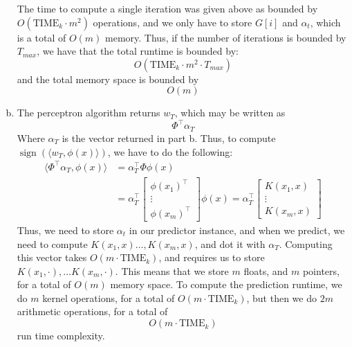 \documentclass{amsart}
\newcommand{\TIMEk}{\mathrm{TIME}_k}
\DeclareMathOperator{\sign}{sign}
\theoremstyle{definition}
\begin{document}
\begin{enumerate}[(a)]
    The time to compute a single iteration was given above as bounded by $O(\TIMEk \cdot m^2)$ operations, and we only have to store $G[i]$ and $\alpha_t$, which is a total of $O(m)$ memory. Thus, if the number of iterations is bounded by $T_{max}$, we have that the total runtime is bounded by:
    \[
      O(\TIMEk \cdot m^2 \cdot T_{max})
    \]
    and the total memory space is bounded by 
    \[
      O(m)
    \]
  \item 
    The perceptron algorithm returns $w_T$, which may be written as 
    \[
      \Phi^\intercal \alpha_T
    \]
    Where $\alpha_T$ is the vector returned in part b. Thus, to compute $\sign(\langle w_T, \phi(x) \rangle)$, we have to do the following:
    \begin{align*}
      \langle \Phi^\intercal \alpha_T, \phi(x) \rangle &= \alpha_T^\intercal \Phi \phi(x) \\
                                             &= \alpha_T^\intercal \begin{bmatrix}
                                              \phi(x_1)^\intercal \\
                                              \vdots \\
                                              \phi(x_m)^\intercal
                                             \end{bmatrix} \phi(x) = \alpha_T^\intercal \begin{bmatrix}
                                              K(x_1, x)\\
                                              \vdots \\
                                              K(x_m, x)
                                             \end{bmatrix}
    \end{align*}
    Thus, we need to store $\alpha_t$ in our predictor instance, and when we predict, we need to compute $K(x_1, x) \ldots, K(x_m, x)$, and dot it with $\alpha_T$. Computing this vector takes $O(m \cdot \TIMEk)$, and requires us to store $K(x_1, \cdot), \ldots K(x_m, \cdot)$. This means that we store $m$ floats, and $m$ pointers, for a total of $O(m)$ memory space. To compute the prediction runtime, we do $m$ kernel operations, for a total of $O(m \cdot \TIMEk)$, but then we do $2m$ arithmetic operations, for a total of 
    \[
      O(m \cdot \TIMEk)
    \]
    run time complexity. 
\end{enumerate}
\end{document}
